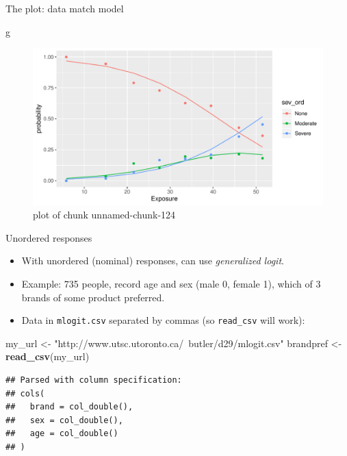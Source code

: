 \documentclass[ignorenonframetext,]{beamer}
\newenvironment{Shaded}{\begin{snugshade}}{\end{snugshade}}
\newcommand{\KeywordTok}[1]{\textcolor[rgb]{0.13,0.29,0.53}{\textbf{#1}}}
\newcommand{\NormalTok}[1]{#1}
\newcommand{\StringTok}[1]{\textcolor[rgb]{0.31,0.60,0.02}{#1}}
\begin{document}
\begin{frame}[fragile]{The plot: data match model}
\protect\hypertarget{the-plot-data-match-model}{}

\begin{Shaded}
\begin{Highlighting}[]
\NormalTok{g}
\end{Highlighting}
\end{Shaded}

\begin{figure}
\centering
\includegraphics{figure/unnamed-chunk-124-1.pdf}
\caption{plot of chunk unnamed-chunk-124}
\end{figure}

\end{frame}

\begin{frame}[fragile]{Unordered responses}
\protect\hypertarget{unordered-responses}{}

\begin{itemize}
\item
  With unordered (nominal) responses, can use \emph{generalized logit}.
\item
  Example: 735 people, record age and sex (male 0, female 1), which of 3
  brands of some product preferred.
\item
  Data in \texttt{mlogit.csv} separated by commas (so \texttt{read\_csv}
  will work):
\end{itemize}

\begin{Shaded}
\begin{Highlighting}[]
\NormalTok{my_url <-}\StringTok{ "http://www.utsc.utoronto.ca/~butler/d29/mlogit.csv"}
\NormalTok{brandpref <-}\StringTok{ }\KeywordTok{read_csv}\NormalTok{(my_url)}
\end{Highlighting}
\end{Shaded}

\begin{verbatim}
## Parsed with column specification:
## cols(
##   brand = col_double(),
##   sex = col_double(),
##   age = col_double()
## )
\end{verbatim}

\end{frame}
\end{document}
